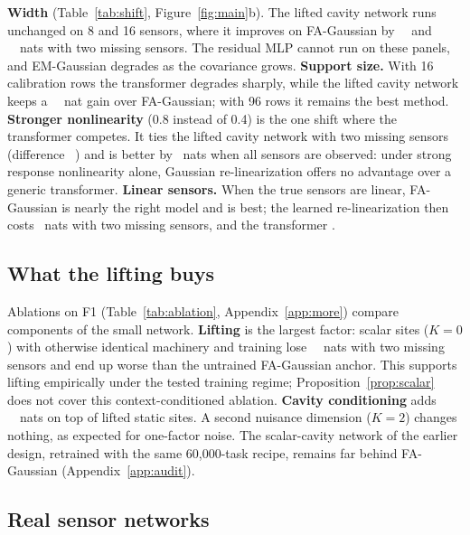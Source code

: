 \textbf{Width} (Table~\ref{tab:shift}, Figure~\ref{fig:main}b). The lifted cavity network runs unchanged on 8 and 16 sensors, where it improves on FA-Gaussian by
\SFTwogainfa\ \SFTwogainfaci\ and \SFThreegainfa\ \SFThreegainfaci\ nats with two missing sensors. The residual MLP
cannot run on these panels, and EM-Gaussian degrades as the covariance grows. 
\textbf{Support size.} With 16 calibration rows the transformer degrades sharply, while the lifted cavity network keeps
a \SFSixgainfa\ \SFSixgainfaci\ nat gain over FA-Gaussian; with 96 rows it remains the best method.
\textbf{Stronger nonlinearity} (0.8 instead of 0.4) is the one shift where the transformer competes. It ties the
lifted cavity network with two missing sensors (difference \XFFourkkTwoliftvspfn\ \XFFourkkTwoliftvspfnci) and is
better by \XFFourkkZeroliftvspfnabs\ nats when all sensors are observed: under strong response nonlinearity alone,
Gaussian re-linearization offers no advantage over a generic transformer.
\textbf{Linear sensors.} When the true sensors are linear, FA-Gaussian is nearly the right model and is best; the
learned re-linearization then costs \SFFivegainfaabs\ nats with two missing sensors, and the transformer
\XFFivekkTwopfnvsfaabs.

\subsection{What the lifting buys}
\label{sec:audit}

Ablations on F1 (Table~\ref{tab:ablation}, Appendix~\ref{app:more}) compare components of the small network. \textbf{Lifting} is the
largest factor: scalar sites ($K=0$) with otherwise identical machinery and training lose \AblLiftabs\ \AblLiftci\ nats
with two missing sensors and end up worse than the untrained FA-Gaussian anchor. This supports lifting empirically
under the tested training regime; Proposition~\ref{prop:scalar} does not cover this context-conditioned ablation.
\textbf{Cavity conditioning} adds \AblCavabs\ \AblCavci\ nats on top of lifted static sites. A second
nuisance dimension ($K=2$) changes nothing, as expected for one-factor noise. The scalar-cavity network of the earlier
design, retrained with the same 60{,}000-task recipe, remains far behind FA-Gaussian (Appendix~\ref{app:audit}).

\subsection{Real sensor networks}
\label{sec:exp-real}

